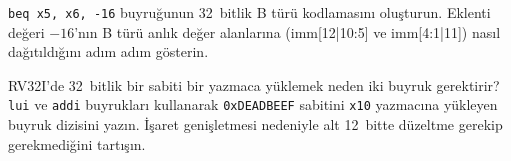 \begin{alistirma}[\zor]
\texttt{beq x5, x6, -16} buyruğunun 32~bitlik B türü kodlamasını oluşturun. Eklenti değeri $-16$'nın B türü anlık değer alanlarına (imm[12|10:5] ve imm[4:1|11]) nasıl dağıtıldığını adım adım gösterin.
\end{alistirma}

\begin{alistirma}[\zor]
RV32I'de 32~bitlik bir sabiti bir yazmaca yüklemek neden iki buyruk gerektirir? \texttt{lui} ve \texttt{addi} buyrukları kullanarak \texttt{0xDEADBEEF} sabitini \texttt{x10} yazmacına yükleyen buyruk dizisini yazın. İşaret genişletmesi nedeniyle alt 12~bitte düzeltme gerekip gerekmediğini tartışın.
\end{alistirma}
